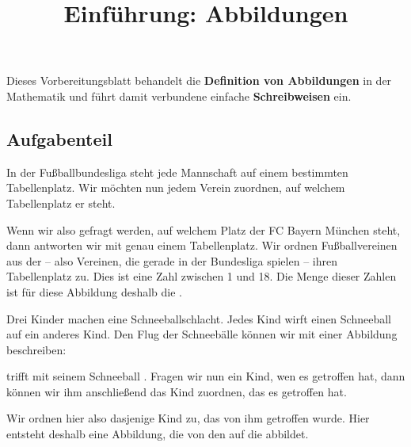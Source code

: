 \documentclass[]{uebungsblatt}
\title{Einführung: Abbildungen}
\begin{document}
\maketitle
\begin{contents}
    Dieses Vorbereitungsblatt behandelt die \textbf{Definition von Abbildungen} in der Mathematik und
    führt damit verbundene einfache \textbf{Schreibweisen} ein.
\end{contents}


\subsection*{Aufgabenteil}
\begin{exercise}
    In der Fußballbundesliga steht jede Mannschaft auf einem bestimmten Tabellenplatz. Wir möchten nun jedem Verein zuordnen, auf welchem Tabellenplatz er steht.
        
    Wenn wir also gefragt werden, auf welchem Platz der FC Bayern München steht, dann antworten wir mit genau einem Tabellenplatz.
    Wir ordnen Fußballvereinen aus der  -- also Vereinen, die gerade in der Bundesliga spielen -- ihren Tabellenplatz zu.
    Dies ist eine Zahl zwischen 1 und 18. Die Menge dieser Zahlen ist für diese Abbildung deshalb die .
\end{exercise}

\begin{exercise}
    Drei Kinder machen eine Schneeballschlacht. Jedes Kind wirft einen Schneeball auf ein anderes Kind. Den Flug der Schneebälle können wir mit einer Abbildung beschreiben:
        
     trifft mit seinem Schneeball . Fragen wir nun ein Kind, wen es getroffen hat, dann können wir ihm anschließend das Kind zuordnen, das es getroffen hat.
        
    Wir ordnen hier also  dasjenige Kind zu, das von ihm getroffen wurde. Hier entsteht deshalb eine Abbildung, die von den  auf die  abbildet.
\end{exercise}
\end{document}
